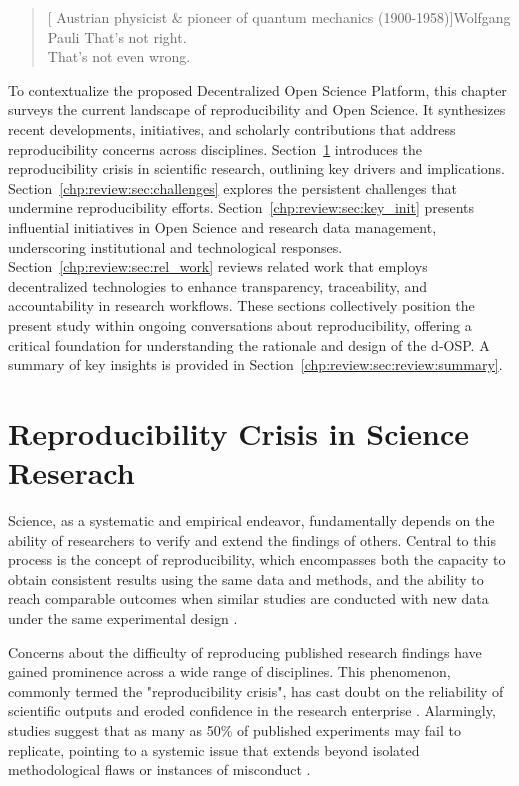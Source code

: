 \documentclass[final]{rc-book-2.14}
\begin{document}
\begin{quotation}[ Austrian physicist \& pioneer of quantum mechanics (1900-1958)]{Wolfgang Pauli}
    That's not right. \\  That's not even wrong.
\end{quotation}

\drop To contextualize the proposed Decentralized Open Science Platform, this chapter surveys the current landscape of reproducibility and Open Science. It synthesizes recent developments, initiatives, and scholarly contributions that address reproducibility concerns across disciplines. Section~\ref{chp:review:sec:rep_crisis} introduces the reproducibility crisis in scientific research, outlining key drivers and implications. Section~\ref{chp:review:sec:challenges} explores the persistent challenges that undermine reproducibility efforts. Section~\ref{chp:review:sec:key_init} presents influential initiatives in Open Science and research data management, underscoring institutional and technological responses. Section~\ref{chp:review:sec:rel_work} reviews related work that employs decentralized technologies to enhance transparency, traceability, and accountability in research workflows. These sections collectively position the present study within ongoing conversations about reproducibility, offering a critical foundation for understanding the rationale and design of the d-OSP. A summary of key insights is provided in Section~\ref{chp:review:sec:review:summary}.



\newpage

\section{Reproducibility Crisis in Science Reserach}
\label{chp:review:sec:rep_crisis}

Science, as a systematic and empirical endeavor, fundamentally depends on the ability of researchers to verify and extend the findings of others. Central to this process is the concept of reproducibility, which encompasses both the capacity to obtain consistent results using the same data and methods, and the ability to reach comparable outcomes when similar studies are conducted with new data under the same experimental design \cite{pellizzari_reproducibility_2017, committee_2019}. 

Concerns about the difficulty of reproducing published research findings have gained prominence across a wide range of disciplines. This phenomenon, commonly termed the "reproducibility crisis", has cast doubt on the reliability of scientific outputs and eroded confidence in the research enterprise \cite{baker2016reproducibility}. Alarmingly, studies suggest that as many as 50\% of published experiments may fail to replicate, pointing to a systemic issue that extends beyond isolated methodological flaws or instances of misconduct \cite{branch_reproducibility_2019}. 
\end{document}
